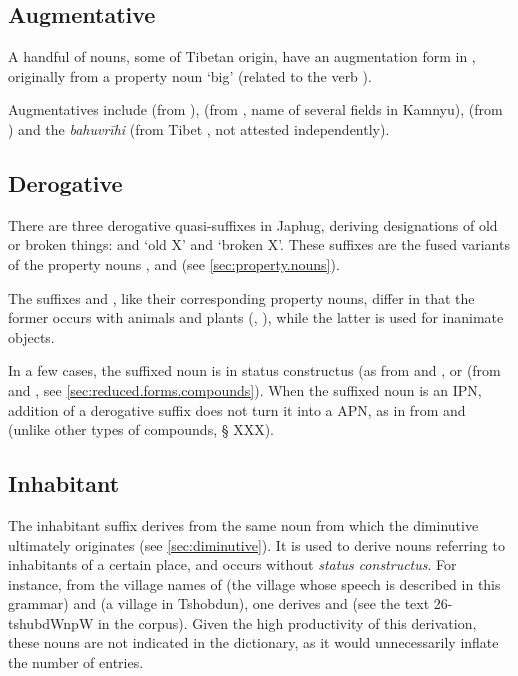 \subsection{Augmentative} \label{sec:augmentative}
A handful of nouns, some of Tibetan origin, have an augmentation form in , originally from a property noun  `big' (related to the verb ).

Augmentatives include  (from ),  (from , name of several fields in Kamnyu),  (from ) and the \textit{bahuvrīhi}  (from Tibet , not attested independently).

\subsection{Derogative} \label{sec:derogative}
There are three derogative quasi-suffixes in Japhug, deriving designations of old or broken things:  and  `old X' and  `broken X'. These suffixes are the fused variants of the property nouns ,  and   (see \ref{sec:property.nouns}). 

The suffixes  and , like their corresponding property nouns, differ in that the former occurs with animals and plants (, ), while the latter is used for inanimate objects.

 In a few cases, the suffixed noun is in status constructus (as  from  and , or  (from  and , see \ref{sec:reduced.forms.compounds}). When the suffixed noun is an IPN, addition of a derogative suffix does not turn it into a APN, as in  from  and  (unlike other types of compounds, § XXX).

\subsection{Inhabitant} \label{ex:inhabitant.pW}
The inhabitant suffix  derives from the same noun  from which the diminutive  ultimately originates (see \ref{sec:diminutive}). It is used to derive nouns referring to inhabitants of a certain place, and occurs without \textit{status constructus}. For instance, from the village names of  (the village whose speech is described in this grammar) and  (a village in Tshobdun), one derives  and  (see the text 26-tshubdWnpW in the corpus). Given the high productivity of this derivation, these nouns are not indicated in the dictionary, as it would unnecessarily inflate the number of entries.

